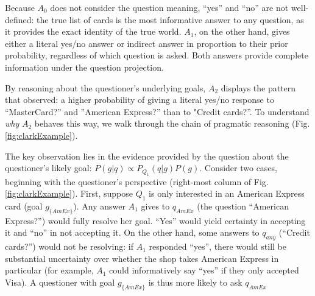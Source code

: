 \documentclass[12pt, floatsintext, jou]{apa6}
\begin{document}
Because $A_0$ does not consider the question meaning, ``yes'' and ``no'' are not well-defined: the true list of cards is the most informative answer to any question, as it provides the exact identity of the true world. $A_1$, on the other hand, gives either a literal yes/no answer or indirect answer in proportion to their prior probability, regardless of which question is asked. Both answers provide complete information under the question projection.

By reasoning about the questioner's underlying goals, $A_2$ displays the pattern that  observed: a higher probability of giving a literal yes/no response to ``MasterCard?'' and ''American Express?'' than to "Credit cards?''. To understand \emph{why} $A_2$ behaves this way, we walk through the chain of pragmatic reasoning (Fig. \ref{fig:clarkExample}).

The key observation lies in the evidence provided by the question about the questioner's likely goal: $P(g | q) \propto P_{Q_1}(q|g)P(g)$. Consider two cases, beginning with the questioner's perspective  (right-most column of Fig. \ref{fig:clarkExample}). First, suppose $Q_1$ is only interested in an American Express card (goal $g_{\{AmEx\}}$). Any answer $A_1$ gives to $q_{AmEx}$ (the question ``American Express?'') would fully resolve her goal. ``Yes'' would yield certainty in accepting it and ``no'' in not accepting it. On the other hand, some answers to $q_{any}$ (``Credit cards?'') would not be resolving: if $A_1$ responded ``yes'', there would still be substantial uncertainty over whether the shop takes American Express in particular (for example, $A_1$ could informatively say ``yes'' if they only accepted Visa). A questioner with goal $g_{\{AmEx\}}$  is thus more likely to ask $q_{AmEx}$


\end{document}
